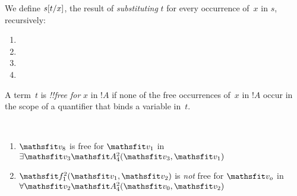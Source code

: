 \documentclass[../../../include/open-logic-section]{subfiles}
\begin{document}


\begin{defn}
We define $s[t/x]$, the result of \emph{substituting} $t$
for every occurrence of~$x$ in $s$, recursively:
\begin{enumerate}
\item {}

\item {}

\item {}

\item{}
\end{enumerate}
\end{defn}

\begin{defn}
A term~$t$ is \emph{!!{free for}} $x$ in $!A$ if none of the free occurrences
of~$x$ in $!A$ occur in the scope of a quantifier that binds a
variable in~$t$.
\end{defn}

\begin{ex} ~
\begin{enumerate}
\item $\Obj v_8$ is free for $\Obj v_1$ in $\lexists[\Obj v_3]\Atom{\Obj A^2_4}{\Obj v_3,\Obj v_1}$

\item $\Obj f^2_1(\Obj v_1, \Obj v_2)$ is \emph{not} free for $\Obj v_o$ in $\lforall[\Obj v_2]\Atom{\Obj A^2_4}{\Obj v_0,\Obj v_2}$
\end{enumerate}
\end{ex}
\end{document}

